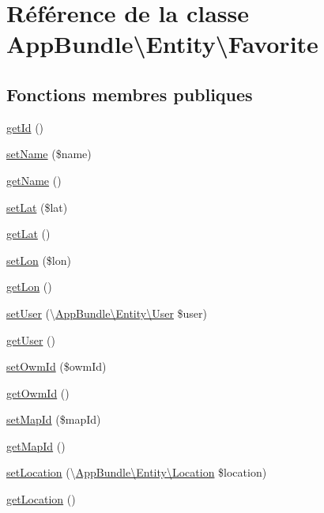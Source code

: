 \hypertarget{classAppBundle_1_1Entity_1_1Favorite}{}\section{Référence de la classe App\+Bundle\textbackslash{}Entity\textbackslash{}Favorite}
\label{classAppBundle_1_1Entity_1_1Favorite}
\subsection*{Fonctions membres publiques}
\begin{DoxyCompactItemize}
\item 
\hyperlink{classAppBundle_1_1Entity_1_1Favorite_add4985c90fac741fcb1a5026bd8551e4}{get\+Id} ()
\item 
\hyperlink{classAppBundle_1_1Entity_1_1Favorite_a22180c0120b1661263dc8e3e2053c9cc}{set\+Name} (\$name)
\item 
\hyperlink{classAppBundle_1_1Entity_1_1Favorite_a66cbf797b0af61339eb9ece8b36ecc1c}{get\+Name} ()
\item 
\hyperlink{classAppBundle_1_1Entity_1_1Favorite_afddba3b312caa97af160fdebc187ad4d}{set\+Lat} (\$lat)
\item 
\hyperlink{classAppBundle_1_1Entity_1_1Favorite_a0092e20408e1e56065c3ffc90a56acf7}{get\+Lat} ()
\item 
\hyperlink{classAppBundle_1_1Entity_1_1Favorite_a8dcb451f06346ea01b131bfc174821dd}{set\+Lon} (\$lon)
\item 
\hyperlink{classAppBundle_1_1Entity_1_1Favorite_a7f467c2a1e0e93b1afcd8710cccd97b7}{get\+Lon} ()
\item 
\hyperlink{classAppBundle_1_1Entity_1_1Favorite_a565975ee6c451fb15aad99e50746f907}{set\+User} (\textbackslash{}\hyperlink{classAppBundle_1_1Entity_1_1User}{App\+Bundle\textbackslash{}\+Entity\textbackslash{}\+User} \$user)
\item 
\hyperlink{classAppBundle_1_1Entity_1_1Favorite_a69db26313aefb7b377ba8e482e6fb0f0}{get\+User} ()
\item 
\hyperlink{classAppBundle_1_1Entity_1_1Favorite_ace4e1309956105ce3511efe64ae79287}{set\+Owm\+Id} (\$owm\+Id)
\item 
\hyperlink{classAppBundle_1_1Entity_1_1Favorite_aca73f8e626c8cf7eb6cdf9a2843e15fe}{get\+Owm\+Id} ()
\item 
\hyperlink{classAppBundle_1_1Entity_1_1Favorite_a2c0e6fb12140e51b95c906ac86b952b9}{set\+Map\+Id} (\$map\+Id)
\item 
\hyperlink{classAppBundle_1_1Entity_1_1Favorite_abbe92666121b77689ef6fc6e137e6a16}{get\+Map\+Id} ()
\item 
\hyperlink{classAppBundle_1_1Entity_1_1Favorite_af6a48e472097646cfa0d79c3162f5cbf}{set\+Location} (\textbackslash{}\hyperlink{classAppBundle_1_1Entity_1_1Location}{App\+Bundle\textbackslash{}\+Entity\textbackslash{}\+Location} \$location)
\item 
\hyperlink{classAppBundle_1_1Entity_1_1Favorite_a2a8222cd57c851020fbedc64398e8744}{get\+Location} ()
\end{DoxyCompactItemize}


